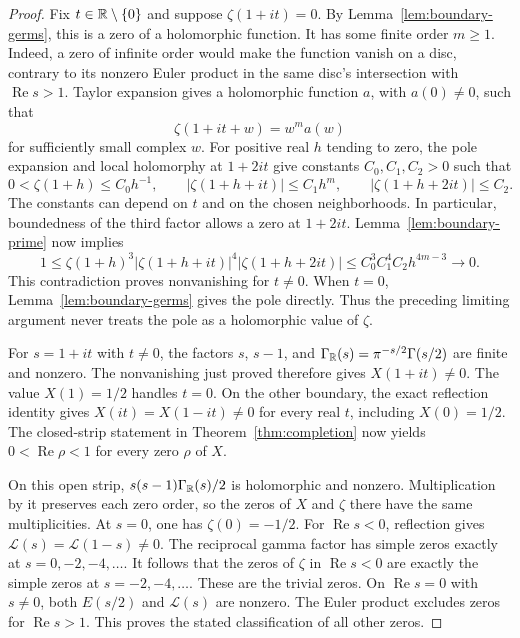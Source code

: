 \begin{proof}
Fix $t\in\mathbb R\setminus\{0\}$ and suppose $\zeta(1+it)=0$.
By Lemma~\ref{lem:boundary-germs}, this is a zero of a holomorphic
function.  It has some finite order $m\geq1$.
Indeed, a zero of infinite order would make the function vanish on a
disc, contrary to its nonzero Euler product in the same disc's
intersection with $\operatorname{Re}s>1$.
Taylor expansion gives a holomorphic function $a$, with $a(0)\ne0$,
such that
\[
 \zeta(1+it+w)=w^m a(w)
\]
for sufficiently small complex $w$.
For positive real $h$ tending to zero, the pole expansion and local
holomorphy at $1+2it$ give constants $C_0,C_1,C_2>0$ such that
\[
 0<\zeta(1+h)\leq C_0h^{-1},\qquad
 |\zeta(1+h+it)|\leq C_1h^m,\qquad
 |\zeta(1+h+2it)|\leq C_2.
\]
The constants can depend on $t$ and on the chosen neighborhoods.
In particular, boundedness of the third factor allows a zero at $1+2it$.
Lemma~\ref{lem:boundary-prime} now implies
\[
 1\leq\zeta(1+h)^3|\zeta(1+h+it)|^4|\zeta(1+h+2it)|
 \leq C_0^3C_1^4C_2 h^{4m-3}\longrightarrow0.
\]
This contradiction proves nonvanishing for $t\ne0$.
When $t=0$, Lemma~\ref{lem:boundary-germs} gives the pole directly.
Thus the preceding limiting argument never treats the pole as a
holomorphic value of $\zeta$.

For $s=1+it$ with $t\ne0$, the factors $s$, $s-1$, and
$\Gamma_{\mathbb R}(s)=\pi^{-s/2}\Gamma(s/2)$ are finite and nonzero.
The nonvanishing just proved therefore gives $X(1+it)\ne0$.
The value $X(1)=1/2$ handles $t=0$.
On the other boundary, the exact reflection identity gives
$X(it)=X(1-it)\ne0$ for every real $t$, including $X(0)=1/2$.
The closed-strip statement in Theorem~\ref{thm:completion} now yields
$0<\operatorname{Re}\rho<1$ for every zero $\rho$ of $X$.

On this open strip, $s(s-1)\Gamma_{\mathbb R}(s)/2$ is holomorphic and
nonzero.  Multiplication by it preserves each zero order, so the zeros
of $X$ and $\zeta$ there have the same multiplicities.
At $s=0$, one has $\zeta(0)=-1/2$.
For $\operatorname{Re}s<0$, reflection gives
$\mathcal L(s)=\mathcal L(1-s)\ne0$.
The reciprocal gamma factor has simple zeros exactly at
$s=0,-2,-4,\ldots$.
It follows that the zeros of $\zeta$ in $\operatorname{Re}s<0$ are
exactly the simple zeros at $s=-2,-4,\ldots$.
These are the trivial zeros.
On $\operatorname{Re}s=0$ with $s\ne0$, both $E(s/2)$ and
$\mathcal L(s)$ are nonzero.  The Euler product excludes zeros for
$\operatorname{Re}s>1$.
This proves the stated classification of all other zeros.


\end{proof}

